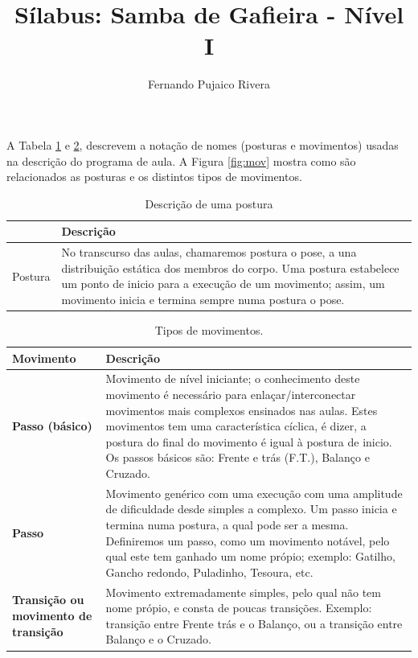 \documentclass{article}
\title{Sílabus: Samba de Gafieira - Nível I}
\author{Fernando Pujaico Rivera}
\date{}
\begin{document}
{\let\newpage\relax\maketitle}
A Tabela \ref{tab:typospos} e \ref {tab:typosmov}, descrevem a notação de nomes  (posturas e movimentos) usadas 
na descrição do programa de aula.
A Figura \ref{fig:mov} mostra como são relacionados as posturas e os distintos tipos de movimentos.


\begin{table}[h]
\centering
\begin{tabular}{|p{3cm}|p{13cm}|}
\hline
~ & Descrição \\  \hline
Postura & No transcurso das aulas, chamaremos postura o pose, a una distribuição estática
dos membros do corpo. Uma postura estabelece um ponto de inicio para a execução de um
movimento; assim, um movimento inicia e termina sempre numa postura o pose.\\ \hline

\end{tabular}
\caption{Descrição de uma postura}
\label{tab:typospos}
\end{table}


\begin{table}[h]
\centering
\begin{tabular}{|p{3cm}|p{13cm}|}
\hline
Movimento & Descrição \\  \hline
\textbf{Passo (básico)} & Movimento de nível iniciante; o conhecimento deste 
movimento é necessário para enlaçar/interconectar movimentos mais complexos ensinados nas aulas. Estes
movimentos tem uma característica cíclica, é dizer, a postura do final do movimento 
é igual à postura de inicio. Os passos básicos são: Frente e trás (F.T.), Balanço e Cruzado.\\ \hline
\textbf{Passo} &  Movimento genérico com uma execução com uma amplitude de dificuldade desde simples a complexo.
Um passo inicia e termina numa postura, a qual pode ser a mesma. Definiremos um passo, como um movimento
notável, pelo qual este tem ganhado um nome própio; exemplo: Gatilho, Gancho redondo, Puladinho, Tesoura, etc. \\ \hline
\textbf{Transição ou movimento de transição} &  Movimento extremadamente simples, pelo qual não tem nome própio,
e consta de poucas transições. Exemplo: transição entre Frente trás e o Balanço, ou a transição entre Balanço e o Cruzado.\\ \hline
\end{tabular}
\caption{Tipos de movimentos.}
\label{tab:typosmov}
\end{table}
\end{document}
